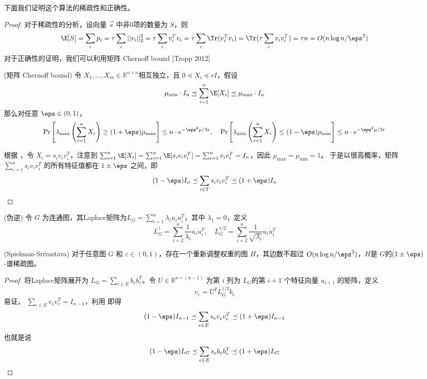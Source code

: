 \documentclass[lang=cn,newtx,10pt,scheme=chinese,chinesefont=nofont,citestyle=gb7714-2015, bibstyle=gb7714-2015]{elegantbook}
\begin{document}
\begin{refsection}
下面我们证明这个算法的稀疏性和正确性。

\begin{proof}
    对于稀疏性的分析，设向量 $\vec{s}$ 中非$0$项的数量为 $S$，则
    \[
    \E[S] =  \sum_i p_i=\tau \sum_i||v_i||_2^2=\tau\sum_i v_i^Tv_i = \tau\sum_i \Tr(v_i^Tv_i) = \Tr(\tau\sum_i v_iv_i^T) =\tau n = O(n\log n/\eps^2)
    \]
    对于正确性的证明，我们可以利用矩阵 Chernoff bound [Tropp 2012]
    \begin{theorem}{(矩阵 Chernoff bound)}
    \label{thm:mathix-chernoff}
        令 $X_1,\dots,X_m\in\mathbb{R}^{n\times n}$相互独立，且 $0\preceq X_i\preceq rI$，假设
        \[
        \mu_{\min}\cdot I_n\preceq \sum_{i=1}^n \E[X_i]\preceq \mu_{\max}\cdot I_n
        \]
        那么对任意 $\eps\in(0,1)$，
        \[
        \Pr\left[\lambda_{\max}\left(\sum_{i=1}^nX_i\right)\geq (1+\eps)\mu_{\max}\right]\leq n\cdot e^{-\eps^2\mu/3r}, \quad \Pr\left[\lambda_{\min}\left(\sum_{i=1}^nX_i\right)\leq (1-\eps)\mu_{\min}\right]\leq n\cdot e^{-\eps^2\mu/2r}
        \]
    \end{theorem}
    根据 ，令 $X_i=s_iv_iv_i^T$，注意到 $\sum_{i=1}^n \E[X_i]=\sum_{i=1}^n\E[s_iv_iv_i^T]=\sum_{i=1}^n v_iv_i^T=I_n$，因此 $\mu_{\max}=\mu_{\min}=1$。
    于是以很高概率，矩阵 $\sum_{i=1}^ns_iv_iv_i^T$ 的所有特征值都在 $1\pm\eps$ 之间，即
    \[
        (1-\eps)I_n\preceq \sum_{i\in T} s_iv_iv_i^T\preceq (1+\eps)I_n
    \]
\end{proof}


\begin{definition}{(伪逆)}
    令 $G$ 为连通图，其Laplace矩阵为$L_G=\sum_{i=1}^n \lambda_i u_iu_i^T$，其中 $\lambda_1=0$，定义
    \[
    L_G^\dagger= \sum_{i=2}^n \frac{1}{\lambda_i} u_iu_i^T,\quad L_G^{\dagger/2}= \sum_{i=2}^n \frac{1}{\sqrt{\lambda_i}} u_iu_i^T
    \]
\end{definition}

\begin{theorem}{(Spielman-Srivastava)}
    对于任意图 $G$ 和 $\varepsilon\in(0,1)$，存在一个重新调整权重的图 $H$，其边数不超过 $O(n\log n /\eps^2)$，$H$是 $G$的$(1\pm \eps)$-谱稀疏图。
\end{theorem}
\begin{proof}
    将Laplace矩阵展开为 $L_G=\sum_{e\in E} b_e b_e^T$。令 $U\in\mathbb{R}^{n\times (n-1)}$ 为第 $i$ 列为 $L_G$的第 $i+1$ 个特征向量 $u_{i+1}$ 的矩阵，定义
    \[
    v_e=U^T L_G^{\dagger/2} b_e
    \]
    易证， $\sum_{e\in E}v_ev_e^T=I_{n-1}$，利用  即得
    \[
    (1-\eps)I_{n-1}\preceq \sum_{e\in E} s_ev_ev_e^T\preceq (1+\eps)I_{n-1}
    \]
    也就是说
    \[
    (1-\eps)L_G\preceq\sum_{e\in E}s_eb_eb_e^T \preceq (1+\eps)L_G
    \]
        

\end{proof}
\end{refsection}
\end{document}
